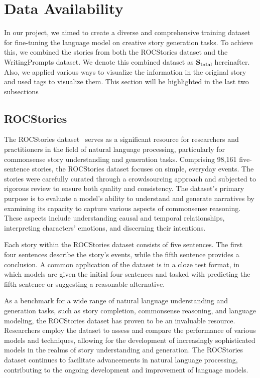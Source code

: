 \documentclass[letterpaper]{article}
\begin{document}
\section{Data Availability}
In our project, we aimed to create a diverse and comprehensive training dataset for fine-tuning the language model on creative story generation tasks. To achieve this, we combined the stories from both the ROCStories dataset and the WritingPrompts dataset. We denote this combined dataset as $\mathbf{S_{total}}$ hereinafter. Also, we applied various ways to visualize the information in the original story and used tags to visualize them. This section will be highlighted in the last two subsections
\subsection{ROCStories}
The ROCStories dataset~\cite{mostafazadeh2016corpus} serves as a significant resource for researchers and practitioners in the field of natural language processing, particularly for commonsense story understanding and generation tasks. Comprising 98,161 five-sentence stories, the ROCStories dataset focuses on simple, everyday events. The stories were carefully curated through a crowdsourcing approach and subjected to rigorous review to ensure both quality and consistency. The dataset's primary purpose is to evaluate a model's ability to understand and generate narratives by examining its capacity to capture various aspects of commonsense reasoning. These aspects include understanding causal and temporal relationships, interpreting characters' emotions, and discerning their intentions.

Each story within the ROCStories dataset consists of five sentences. The first four sentences describe the story's events, while the fifth sentence provides a conclusion. A common application of the dataset is in a cloze test format, in which models are given the initial four sentences and tasked with predicting the fifth sentence or suggesting a reasonable alternative.

As a benchmark for a wide range of natural language understanding and generation tasks, such as story completion, commonsense reasoning, and language modeling, the ROCStories dataset has proven to be an invaluable resource. Researchers employ the dataset to assess and compare the performance of various models and techniques, allowing for the development of increasingly sophisticated models in the realms of story understanding and generation. The ROCStories dataset continues to facilitate advancements in natural language processing, contributing to the ongoing development and improvement of language models.
\end{document}
